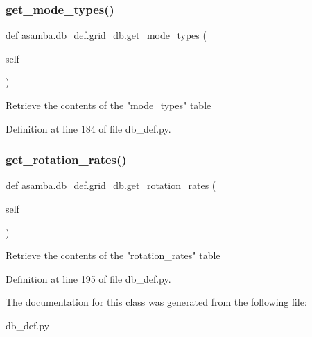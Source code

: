 \subsubsection{\texorpdfstring{get\+\_\+mode\+\_\+types()}{get\_mode\_types()}}
{\footnotesize\ttfamily def asamba.\+db\+\_\+def.\+grid\+\_\+db.\+get\+\_\+mode\+\_\+types (\begin{DoxyParamCaption}\item[{}]{self }\end{DoxyParamCaption})}

\begin{DoxyVerb}Retrieve the contents of the "mode_types" table
\end{DoxyVerb}
 

Definition at line 184 of file db\+\_\+def.\+py.

\mbox{\label{classasamba_1_1db__def_1_1grid__db_a27c84439882e562a5e7b53c39d43383f}} 
\subsubsection{\texorpdfstring{get\+\_\+rotation\+\_\+rates()}{get\_rotation\_rates()}}
{\footnotesize\ttfamily def asamba.\+db\+\_\+def.\+grid\+\_\+db.\+get\+\_\+rotation\+\_\+rates (\begin{DoxyParamCaption}\item[{}]{self }\end{DoxyParamCaption})}

\begin{DoxyVerb}Retrieve the contents of the "rotation_rates" table
\end{DoxyVerb}
 

Definition at line 195 of file db\+\_\+def.\+py.



The documentation for this class was generated from the following file\+:\begin{DoxyCompactItemize}
\item 
db\+\_\+def.\+py\end{DoxyCompactItemize}
